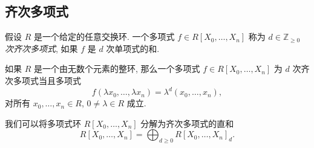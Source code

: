 \subsection{齐次多项式}

假设 \( R \) 是一个给定的任意交换环. 一个多项式 \( f \in R[X_0, \ldots, X_n] \)
称为 \emph{\( d \in \mathbb{Z}_{\geq 0} \) 次齐次多项式}, 如果 \( f \) 是 \( d
\) 次单项式的和.

\begin{proposition}
  如果 \( R \) 是一个由无数个元素的整环, 那么一个多项式 \( f \in R[X_0, \ldots,
  X_n] \) 为 \( d \) 次齐次多项式当且多项式
  \[
    f(\lambda x_0, \ldots, \lambda x_n) = \lambda^d(x_0, \ldots, x_n),
  \]
  对所有 \( x_0, \ldots, x_n \in R \), \( 0 \neq \lambda \in R \) 成立.
\end{proposition}

我们可以将多项式环 \( R[X_0,\ldots, X_n] \) 分解为齐次多项式的直和
\[
  R[X_0, \ldots, X_n] = \bigoplus_{d \geq 0} R[X_0, \ldots, X_n]_d.
\]

